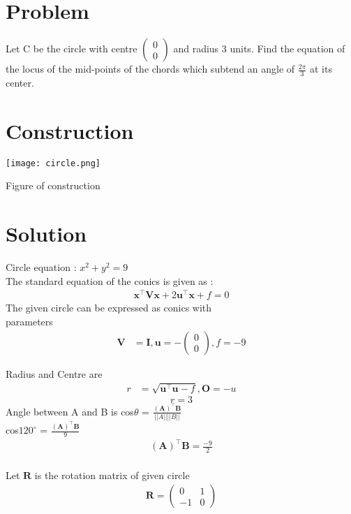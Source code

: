 \documentclass[10pt, a4paper]{article}
\title{\mytitle}
\author{\myauthor\hspace{1em}\\\contact\\FWC22062\hspace{6.5em}IITH\hspace{0.5em}\mymodule\hspace{6em}Assignment}
\newcommand{\myvec}[1]{\ensuremath{\begin{pmatrix}#1\end{pmatrix}}}
\let\vec\mathbf
\begin{document}
	\maketitle
	\tableofcontents
   \section{Problem}
  Let C be the circle with centre $\myvec{0 \\0}$ and radius 3 units. Find the equation of the locus of the mid-points of the chords which subtend an angle of $\frac{2\pi}{3}$ at its center.
\section{Construction}
  \texttt{[image: circle.png]}
  	\begin{center}
  Figure of construction
  	\end{center}
  \section{Solution}

Circle equation : $x^2+y^2=9$\\
The standard equation of the conics is given as :
\begin{align}
\vec{x}^{\top}\vec{V}\vec{x}+2\vec{u}^{\top}\vec{x}+f=0
\end{align}
The given circle  can be expressed as conics with \\parameters
\begin{align}
	\vec{V} &= \vec{I}, \vec{u} = -\myvec{0 \\0}, f = -9
	\end{align}

	Radius and Centre are
	\begin{align}
	r &=\sqrt{{\vec{u}^{\top}\vec{u}}-f },\vec{O}=-u
    \end{align}
\begin{equation}
  r=3
\end{equation}
Angle between A and B is cos$\theta$ = $\frac{\vec{(A)}^{\top}\vec{B}}{||A|| ||B||}$ \\
\centering cos$120^{\circ}$ = $\frac{\vec{(A)}^{\top}\vec{B}}{9}$
\begin{align}
    \vec{(A)}^{\top}\vec{B}=\frac{-9}{2}
\end{align}\\
Let $\vec{R}$ is the rotation matrix of given circle  \\\vspace{1mm}
\begin{align}
 \vec{R} = \myvec{0 & 1 \\-1 & 0}
\end{align}
\end{document}
